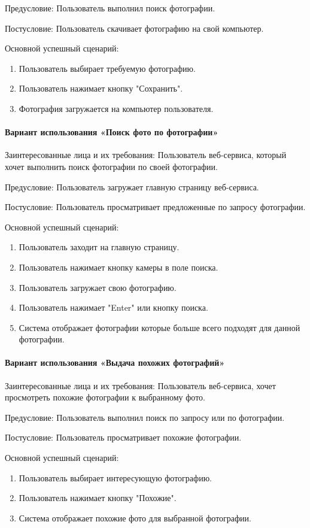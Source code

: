 Предусловие: Пользователь выполнил поиск фотографии.

Постусловие: Пользователь скачивает фотографию на свой компьютер.

Основной успешный сценарий:
\begin{enumerate}
	\item Пользователь выбирает требуемую фотографию.
	\item Пользователь нажимает кнопку "Сохранить".
	\item Фотография загружается на компьютер пользователя.
\end{enumerate}

\paragraph{Вариант использования «Поиск фото по фотографии»}
Заинтересованные лица и их требования: Пользователь веб-сервиса, который хочет выполнить поиск фотографии по своей фотографии.

Предусловие: Пользователь загружает главную страницу веб-сервиса.

Постусловие: Пользователь просматривает предложенные по запросу фотографии.

Основной успешный сценарий:
\begin{enumerate}
	\item Пользователь заходит на главную страницу.
	\item Пользователь нажимает кнопку камеры в поле поиска.
	\item Пользователь загружает свою фотографию.
	\item Пользователь нажимает "Enter" или кнопку поиска.
	\item Система отображает фотографии которые больше всего подходят для данной фотографии.
\end{enumerate}

\paragraph{Вариант использования «Выдача похожих фотографий»}
Заинтересованные лица и их требования: Пользователь веб-сервиса, хочет просмотреть похожие фотографии к выбранному фото.

Предусловие: Пользователь выполнил поиск по запросу или по фотографии.

Постусловие: Пользователь просматривает похожие фотографии.

Основной успешный сценарий:
\begin{enumerate}
	\item Пользователь выбирает интересующую фотографию.
	\item Пользователь нажимает кнопку "Похожие".
	\item Система отображает похожие фото для выбранной фотографии.
\end{enumerate}

